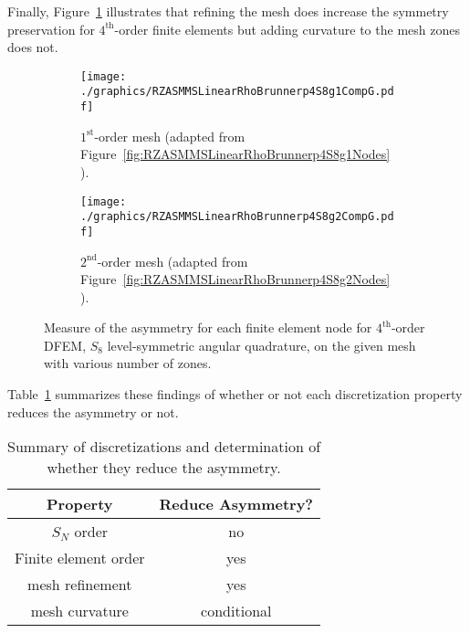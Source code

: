\documentclass[12pt,letterpaper]{article}
\begin{document}
%
Finally, Figure~\ref{fig:RZASMMSLinearRhoBrunnerp4S8NodesSymmetry} illustrates that refining the mesh does increase the symmetry preservation for $4^\text{th}$-order finite elements but adding curvature to the mesh zones does not.
%
\begin{figure}[!htb]
\centering
\begin{subfigure}{0.48\textwidth}
\centering
\texttt{[image: ./graphics/RZASMMSLinearRhoBrunnerp4S8g1CompG.pdf]}
\caption{$1^\text{st}$-order mesh (adapted from Figure~\ref{fig:RZASMMSLinearRhoBrunnerp4S8g1Nodes}).}
\end{subfigure}%
\hspace{0.04\textwidth}%
\begin{subfigure}{0.48\textwidth}
\centering
\texttt{[image: ./graphics/RZASMMSLinearRhoBrunnerp4S8g2CompG.pdf]}
\caption{$2^\text{nd}$-order mesh (adapted from Figure~\ref{fig:RZASMMSLinearRhoBrunnerp4S8g2Nodes}).}
\end{subfigure}
\caption{Measure of the asymmetry for each finite element node for $4^\text{th}$-order DFEM, $S_8$ level-symmetric angular quadrature, on the given mesh with various number of zones.}
\label{fig:RZASMMSLinearRhoBrunnerp4S8NodesSymmetry}
\end{figure}

Table~\ref{tab:AxisymmetrySummary} summarizes these findings of whether or not each discretization property reduces the asymmetry or not.
%
\begin{table}[!htb]
\begin{tabular}{|c|c|}
\hline
Property & Reduce Asymmetry? \\\hline
$S_N$ order & no \\\hline
Finite element order & yes \\\hline
mesh refinement & yes \\\hline
mesh curvature & conditional \\\hline
\end{tabular}
\caption{Summary of discretizations and determination of whether they reduce the asymmetry.}
\label{tab:AxisymmetrySummary}
\end{table}
\end{document}
